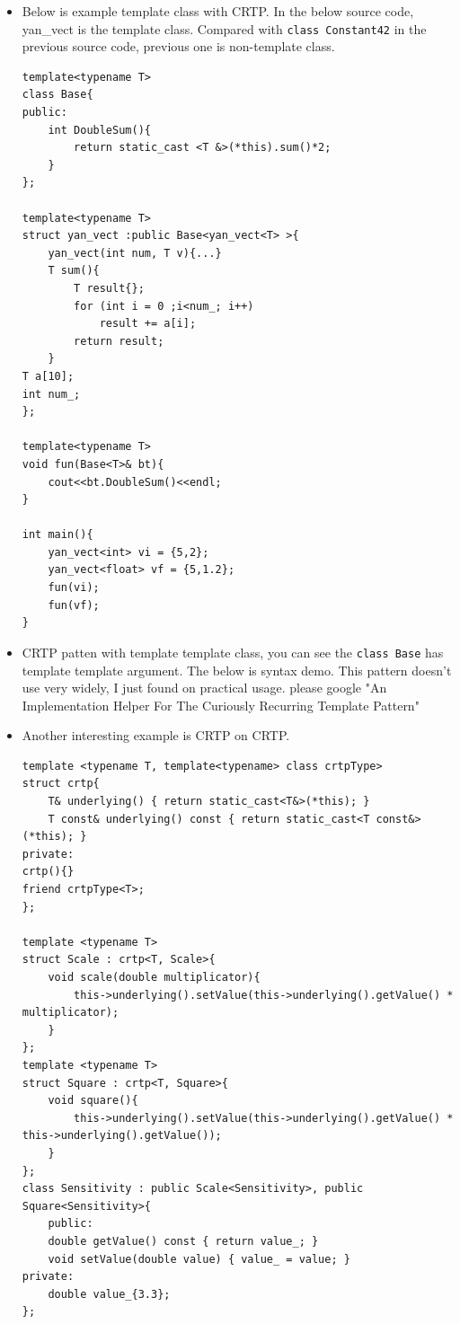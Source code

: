\documentclass[a4paper,11pt,twoside]{book}
\begin{document}
\begin{itemize}
	\item Below is example template class with CRTP. In the below source code, yan\_vect is the template class. Compared with \texttt{class Constant42} in the previous source code, previous one is non-template class. 
\begin{lstlisting}
template<typename T>
class Base{
public:
	int DoubleSum(){
		return static_cast <T &>(*this).sum()*2;
	}    
};

template<typename T>
struct yan_vect :public Base<yan_vect<T> >{
	yan_vect(int num, T v){...}
	T sum(){
		T result{};
		for (int i = 0 ;i<num_; i++)
			result += a[i];
		return result;
	}
T a[10];
int num_;
};

template<typename T>
void fun(Base<T>& bt){
	cout<<bt.DoubleSum()<<endl;
}

int main(){
	yan_vect<int> vi = {5,2};
	yan_vect<float> vf = {5,1.2};
	fun(vi);
	fun(vf);
}
\end{lstlisting}

\item CRTP patten with template template class, you can see the \texttt{class Base} has template template argument. The below is syntax demo. This pattern doesn't use very widely, I just found on practical usage. please google "An Implementation Helper For The Curiously Recurring Template Pattern"

%
%
%

\item Another interesting example is CRTP on CRTP.
\begin{lstlisting}
template <typename T, template<typename> class crtpType>
struct crtp{
	T& underlying() { return static_cast<T&>(*this); }
	T const& underlying() const { return static_cast<T const&>(*this); }
private:
crtp(){}
friend crtpType<T>;
};

template <typename T>
struct Scale : crtp<T, Scale>{
	void scale(double multiplicator){
		this->underlying().setValue(this->underlying().getValue() * multiplicator);
	}
};
template <typename T>
struct Square : crtp<T, Square>{
	void square(){
		this->underlying().setValue(this->underlying().getValue() * this->underlying().getValue());
	}
};
class Sensitivity : public Scale<Sensitivity>, public Square<Sensitivity>{
	public:
	double getValue() const { return value_; }
	void setValue(double value) { value_ = value; }	
private:
	double value_{3.3};
};


\end{lstlisting}
\end{itemize}
\end{document}
